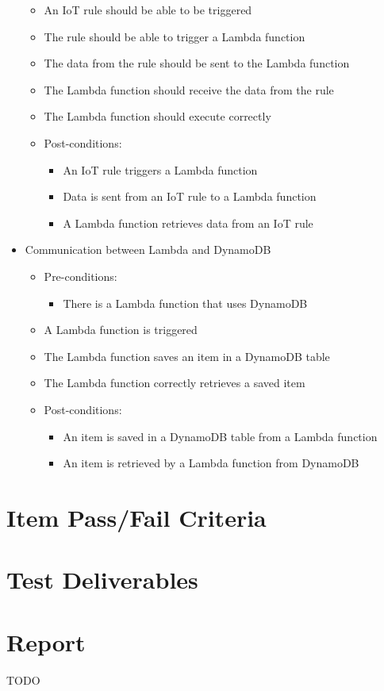 \documentclass{article}
\begin{document}
\begin{itemize}
\begin{itemize}
\begin{itemize}
			\end{itemize}
			\item An IoT rule should be able to be triggered
			\item The rule should be able to trigger a Lambda function
			\item The data from the rule should be sent to the Lambda function 
			\item The Lambda function should receive the data from the rule
			\item The Lambda function should execute correctly
			\item Post-conditions:
			\begin{itemize}
				\item An IoT rule triggers a Lambda function
				\item Data is sent from an IoT rule to a Lambda function
				\item A Lambda function retrieves data from an IoT rule
			\end{itemize}
		\end{itemize}
		
		\item{Communication between Lambda and DynamoDB}
		\begin{itemize}
			\item Pre-conditions: 
			\begin{itemize}
				\item There is a Lambda function that uses DynamoDB
			\end{itemize}
			\item A Lambda function is triggered
			\item The Lambda function saves an item in a DynamoDB table
			\item The Lambda function correctly retrieves a saved item
			\item Post-conditions:
			\begin{itemize}
				\item An item is saved in a DynamoDB table from a Lambda function
				\item An item is retrieved by a Lambda function from DynamoDB
			\end{itemize}
		\end{itemize}
	\end{itemize}
\section{Item Pass/Fail Criteria}

\section{Test Deliverables}

\section{Report}

TODO
\end{document}
